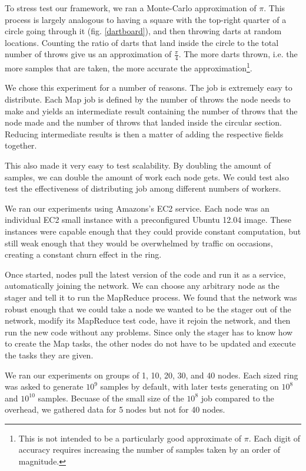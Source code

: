 \documentclass[10pt, conference, compsocconf]{IEEEtran}
\begin{document}
To stress test our framework, we ran a Monte-Carlo approximation of $\pi$. This process is largely analogous to having a square with the top-right quarter of a circle going through it (fig. \ref{dartboard}), and then throwing darts at random locations. Counting the ratio of darts that land inside the circle to the total number of throws give us an approximation of $\frac{\pi}{4}$.  The more darts thrown, i.e. the more samples that are taken, the more accurate the approximation\footnote{This is not intended to be a particularly good approximate of $\pi$. Each digit of accuracy requires increasing the number of samples taken by an order of magnitude.}.

We chose this experiment for a number of reasons. The job is extremely easy to distribute. Each Map job is defined by the number of throws the node needs to make and yields an intermediate result containing the number of throws that the node made and the number of throws that landed inside the circular section.  Reducing intermediate results is then a matter of adding the respective fields together. 

This also made it very easy to test scalability. By doubling the amount of samples, we can double the amount of work each node gets.  We could test also test the effectiveness of distributing job among different numbers of workers. 

We ran our experiments using Amazons's EC2 service.  Each node was an individual EC2 small instance \cite{amazon-instances} with a preconfigured Ubuntu 12.04 image.  These instances were capable enough that they could provide constant computation, but still weak enough that they would be overwhelmed by traffic on occasions, creating a constant churn effect in the ring.  

Once started, nodes pull the latest version of the code and run it as a service, automatically joining the network.  We can choose any arbitrary node as the stager and tell it to run the MapReduce process. We found that the network was robust enough that we could take a node we wanted to be the stager out of the network, modify its MapReduce test code, have it rejoin the network, and then run the new code without any problems. Since only the stager has to know how to create the Map tasks, the other nodes do not have to be updated and execute the tasks they are given.

We ran our experiments on groups of 1, 10, 20, 30, and 40 nodes.  Each sized ring was asked to generate $10^{9}$ samples by default, with later tests generating on $10^{8}$ and $10^{10}$ samples.  Becuase of the small size of the $10^{8}$ job compared to the overhead, we gathered data for 5 nodes but not for 40 nodes. 
\end{document}
